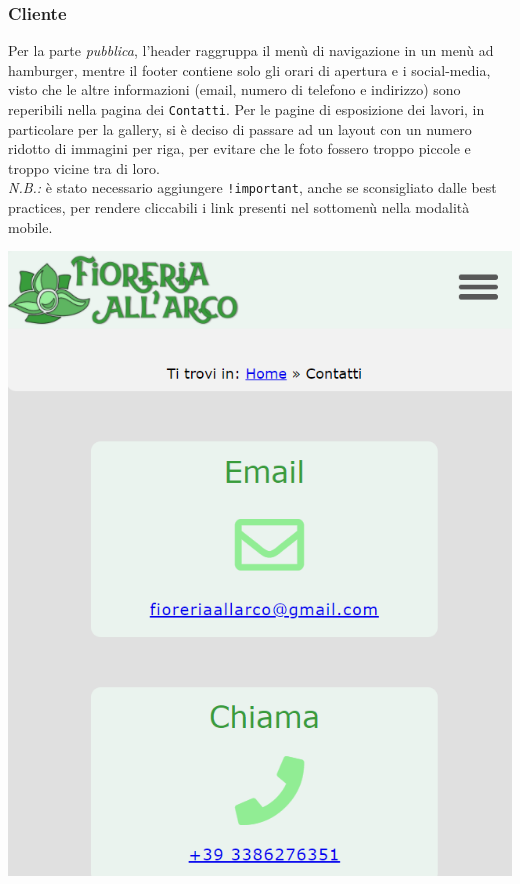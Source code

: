 \subsubsection{Cliente}
Per la parte \textit{pubblica}, l'header raggruppa il menù di navigazione in un menù ad hamburger, mentre il footer contiene solo gli orari di apertura e i social-media, visto che le altre informazioni (email, numero di telefono e indirizzo) sono reperibili nella pagina dei \texttt{Contatti}. Per le pagine di esposizione dei lavori, in particolare per la gallery, si è deciso di passare ad un layout con un numero ridotto di immagini per riga, per evitare che le foto fossero troppo piccole e troppo vicine tra di loro.\\
\textit{N.B.:} è stato necessario aggiungere \texttt{!important}, anche se sconsigliato dalle best practices, per rendere cliccabili i link presenti nel sottomenù nella modalità mobile. 
\begin{center}
\includegraphics[scale = 0.35]{../latex/images/mobileclient.png}\\[0.5cm]
\end{center}
